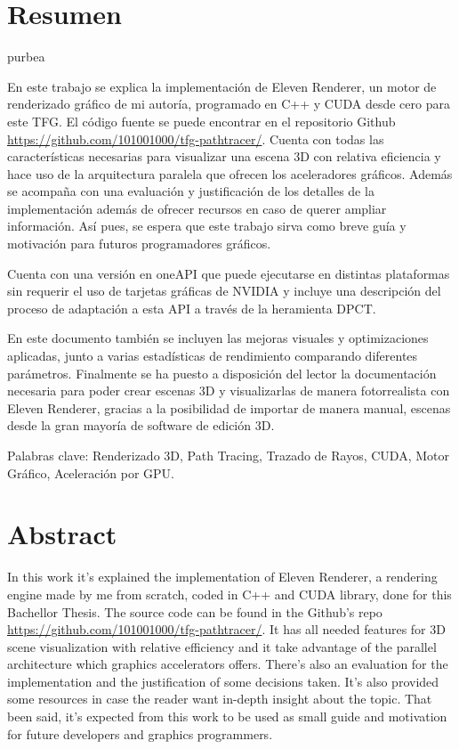 \chapter*{Resumen}

purbea

En este trabajo se explica la implementación de Eleven Renderer, un motor de renderizado gráfico de mi autoría, programado en C++ y CUDA desde cero para este TFG. El código fuente se puede encontrar en el repositorio Github \url{https://github.com/101001000/tfg-pathtracer/}. Cuenta con todas las características necesarias para visualizar una escena 3D con relativa eficiencia y hace uso de la arquitectura paralela que ofrecen los aceleradores gráficos. Además se acompaña con una evaluación y justificación de los detalles de la implementación además de ofrecer recursos en caso de querer ampliar información. Así pues, se espera que este trabajo sirva como breve guía y motivación para futuros programadores gráficos.

Cuenta con una versión en oneAPI que puede ejecutarse en distintas plataformas sin requerir el uso de tarjetas gráficas de NVIDIA y incluye una descripción del proceso de adaptación a esta API a través de la heramienta DPCT.

En este documento también se incluyen las mejoras visuales y optimizaciones aplicadas, junto a varias estadísticas de rendimiento comparando diferentes parámetros. Finalmente se ha puesto a disposición del lector la documentación necesaria para poder crear escenas 3D y visualizarlas de manera fotorrealista con Eleven Renderer, gracias a la posibilidad de importar de manera manual, escenas desde la gran mayoría de software de edición 3D. 

Palabras clave: Renderizado 3D, Path Tracing, Trazado de Rayos, CUDA, Motor Gráfico, Aceleración por GPU.

\chapter*{Abstract}

In this work it's explained the implementation of Eleven Renderer, a rendering engine made by me from scratch, coded in C++ and CUDA library, done for this Bachellor Thesis. The source code can be found in the Github's repo \url{https://github.com/101001000/tfg-pathtracer/}. It has all needed features for 3D scene visualization with relative efficiency and it take advantage of the parallel architecture which graphics accelerators offers. There's also an evaluation for the implementation and the justification of some decisions taken. It's also provided some resources in case the reader want in-depth insight about the topic. That been said, it's expected from this work to be used as small guide and motivation for future developers and graphics programmers.

